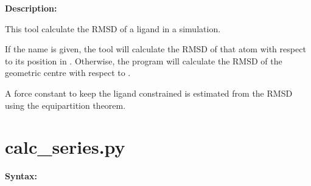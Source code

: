 \documentclass[letterpaper,10pt,english]{sphinxmanual}
\begin{document}
\textbf{Description:}

This tool calculate the RMSD of a ligand in a simulation.

If the  name is given, the tool will calculate the RMSD of that atom with respect to its position in . Otherwise, the program will calculate the RMSD of the geometric centre with respect to .

A force constant to keep the ligand constrained is estimated from the RMSD using the equipartition theorem.


\section{calc\_series.py}
\label{tools:calc-series-py}
\textbf{Syntax:}

\end{document}
